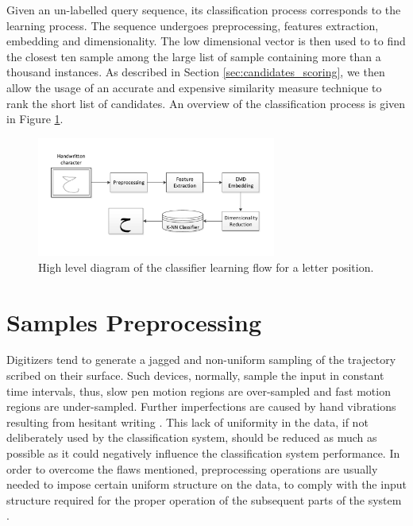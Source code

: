 \iftoggle{edit-mode}{\hspace{0pt}\marginpar{The recognition process}}{}
Given an un-labelled query sequence, its classification process corresponds to the learning process.
The sequence undergoes preprocessing, features extraction, embedding and dimensionality.
The low dimensional vector is then used to to find the closest ten sample among the large list of sample containing more than a thousand instances.
As described in Section \ref{sec:candidates_scoring}, we then allow the usage of an accurate and expensive similarity measure technique to rank the short list of candidates. 
An overview of the classification process is given in Figure \ref{fig:letters_classifier_learning_flow}.

\begin{figure}
\centering
\includegraphics[width=0.7\textwidth]{./figures/letters_classifier_learning_flow}       
\caption{High level diagram of the classifier learning flow for a letter position.}
\label{fig:letters_classifier_learning_flow}
\end{figure}


\newpage{}

\section{Samples Preprocessing}
\label{sec:preprocessing}

\iftoggle{edit-mode}{\hspace{0pt}\marginpar{Introduction}}{}
Digitizers tend to generate a jagged and non-uniform sampling of the trajectory scribed on their surface.
Such devices, normally, sample the input in constant time intervals, thus, slow pen motion regions are over-sampled and fast motion regions are under-sampled.
Further imperfections are caused by hand vibrations resulting from hesitant writing \cite{huang2009preprocessing}.
This lack of uniformity in the data, if not deliberately used by the classification system, should be reduced as much as possible as it could negatively influence the classification system performance.
In order to overcome the flaws mentioned, preprocessing operations are usually needed to impose certain uniform structure on the data, to comply with the input structure required for the proper operation of the subsequent parts of the system \cite{al2011online}.

